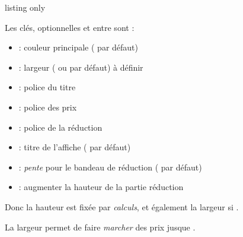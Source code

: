 \documentclass[french,11pt,a4paper]{article}
\begin{document}
\begin{DemoCode}{listing only}
\end{DemoCode}

\begin{DemoCode}{}
\end{DemoCode}

Les clés, optionnelles et entre \MontreCode{[...]} sont :

\begin{itemize}
	\item {} : couleur principale ( par défaut)
	\item {} : largeur ( ou par défaut) à définir
	\item {} : police du titre
	\item {} : police des prix
	\item {} : police de la réduction
	\item {} : titre de l'affiche ( par défaut)
	\item {} : \textit{pente} pour le bandeau de réduction (\MontreCode{1.25cm} par défaut)
	\item {} : augmenter la hauteur de la partie réduction
\end{itemize}

Donc la hauteur est fixée par \textit{calculs}, et également la largeur si .

La largeur  permet de faire \textit{marcher} des prix jusque .

\begin{DemoCode}{}
~%
~%
~%
\AfficheSoldes[Couleur=teal]{\ldots}{\ldots}{\ldots}
\end{DemoCode}

\begin{DemoCode}{}
\end{DemoCode}
\end{document}
